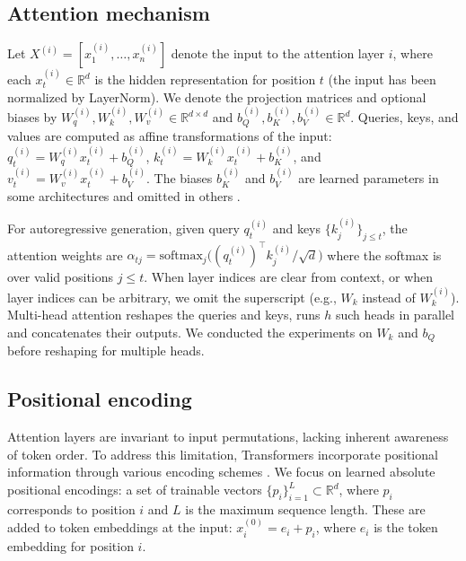 \documentclass[11pt]{article}
\newif\ifYRMcomments
\newif\ifResolvedcomments
\newcommand{\YRM}[1]{\ifYRMcomments\textcolor{red}{[YRM: #1]}\fi}
\newcommand{\Resolved}[1]{\ifResolvedcomments\textcolor{green}{[Resolved: #1]}\fi}
\begin{document}
\subsection{Attention mechanism}
Let $X^{(i)}=[x_1^{(i)},\ldots,x_n^{(i)}]$ denote the input to the attention layer $i$, where each $x_t^{(i)}\in\mathbb{R}^{d}$ is the hidden representation for position $t$ (the input has been normalized by LayerNorm). We denote the projection matrices and optional biases by $W_q^{(i)},W_k^{(i)},W_v^{(i)}\in\mathbb{R}^{d\times d}$ and $b_Q^{(i)},b_K^{(i)},b_V^{(i)}\in\mathbb{R}^{d}$. Queries, keys, and values are computed as affine transformations of the input: $q_t^{(i)}=W_q^{(i)}x_t^{(i)} + b_Q^{(i)}$, $k_t^{(i)}=W_k^{(i)}x_t^{(i)} + b_K^{(i)}$, and $v_t^{(i)}=W_v^{(i)}x_t^{(i)} + b_V^{(i)}$. The biases $b_K^{(i)}$ and $b_V^{(i)}$ are learned parameters in some architectures \cite{vaswani2017attention} and omitted in others \cite{touvron2023llama2}. \YRM{Verify and add more specific citations for bias usage patterns}

For autoregressive generation, given query $q_t^{(i)}$ and keys $\{k_j^{(i)}\}_{j\le t}$, the attention weights are $\alpha_{t j}=\mathrm{softmax}_j\!\big((q_t^{(i)})^\top k_j^{(i)} / \sqrt{d}\big)$ \YRM{I changed the transpose here to be on the Q, please make sure that OK (this is better for later). Make sure this changes fit all other places/notations)}where the softmax is over valid positions $j \le t$. When layer indices are clear from context, or when layer indices can be arbitrary, we omit the superscript (e.g., $W_k$ instead of $W_k^{(i)}$). Multi-head attention reshapes the queries and keys, runs $h$ such heads in parallel and concatenates their outputs. We conducted the experiments on $W_k$ and $b_Q$ before reshaping for multiple heads. \Resolved{Add text about heads and how we are doing experiments for them troughout the paper}

\subsection{Positional encoding}
Attention layers are invariant to input permutations, lacking inherent awareness of token order. To address this limitation, Transformers incorporate positional information through various encoding schemes \YRM{Cite}. We focus on learned absolute positional encodings: a set of trainable vectors $\{p_i\}_{i=1}^{L} \subset \mathbb{R}^{d}$, where $p_i$ corresponds to position $i$ and $L$ is the maximum sequence length. These are added to token embeddings at the input: $x_i^{(0)} = e_i + p_i$, where $e_i$ is the token embedding for position $i$.
\end{document}
